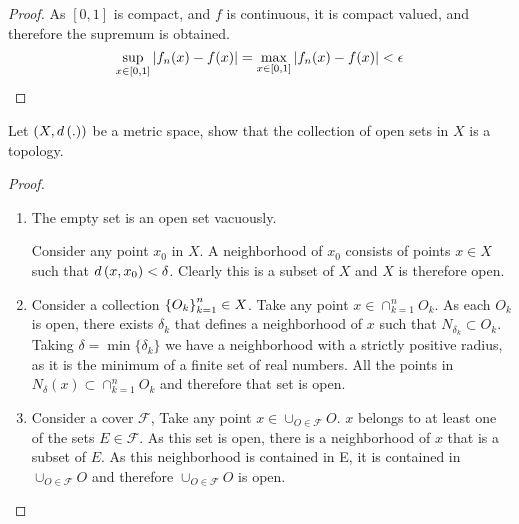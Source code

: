 \documentclass[12pt, letterpaper]{paper}
\begin{document}
\begin{question}
\begin{proof}
    As $[0,1]$ is compact, and $f$ is continuous, it is compact
    valued, and therefore the supremum is obtained.
    \begin{equation*}
      \sup_{x \in [0,1]}\left \lvert  f_n(x) - f(x) \right \rvert  = \max_{x \in [0,1]} \left \lvert 
        f_n(x) - f(x) \right \rvert < \epsilon
    \end{equation*}
  \end{proof}
\end{question}

\begin{question}
  Let $(X,d \left ( . \right ))$ be a metric space, show that the collection of
  open sets in $X$ is a topology.

  \begin{proof}
    \begin{enumerate}
    \item The empty set is an open set vacuously.

      Consider any point $x_0$ in $X$. A neighborhood of $x_0$
      consists of points $x \in X$ such that $d \left ( x,x_0 \right ) < \delta$. Clearly
      this is a subset of $X$ and $X$ is therefore open.
    \item Consider a collection ${\left \{ O_k \right \}}_{k=1}^n \in X$. Take any
      point $x \in \cap_{k=1}^n O_k$. As each $O_k$ is open, there exists
      $\delta_k$ that defines a neighborhood of $x$ such that $N_{\delta_k} \subset
      O_k$. Taking $\delta = \min \{ \delta_k\}$ we have a neighborhood with a
      strictly positive radius, as it is the minimum of a finite set
      of real numbers. All the points in $N_{\delta}(x) \subset \cap_{k=1}^n O_k$ and
      therefore that set is open.
    \item Consider a cover $\mathcal{F}$, Take any point $x \in \cup_{O \in
        \mathcal{F}} O$. $x$ belongs to at least one of the sets $E \in
      \mathcal{F}$. As this set is open, there is a neighborhood of
      $x$ that is a subset of $E$. As this neighborhood is contained
      in E, it is contained in $\cup_{O \in \mathcal{F}} O$ and therefore
      $\cup_{O \in \mathcal{F}} O$ is open.
    \end{enumerate}
  \end{proof}
\end{question}
\end{document}
